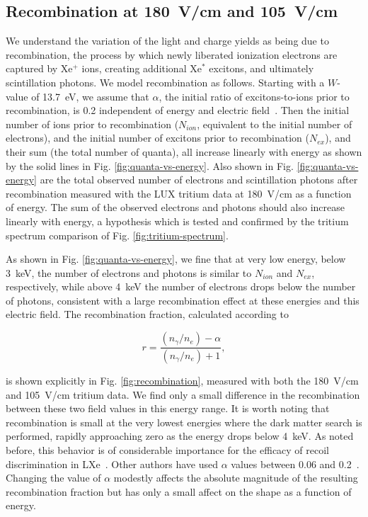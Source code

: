 \subsection{Recombination at 180~V/cm and 105~V/cm}

We understand the variation of the light and charge yields as being due to recombination, the process by which newly liberated ionization electrons are captured by Xe$^+$ ions, creating additional Xe$^*$ excitons, and ultimately scintillation photons. We model recombination as follows. Starting with a $W$-value of 13.7~eV, we assume that $\alpha$, the initial ratio of excitons-to-ions prior to recombination, is 0.2 independent of energy and electric field~\cite{Doke_alpha}. Then the initial number of ions prior to recombination ($N_{ion}$, equivalent to the initial number of electrons), and the initial number of excitons prior to recombination ($N_{ex}$), and their sum (the total number of quanta), all increase linearly with energy as shown by the solid lines in Fig. \ref{fig:quanta-vs-energy}. Also shown in Fig. \ref{fig:quanta-vs-energy} are the total observed number of electrons and scintillation photons after recombination measured with the LUX tritium data at 180~V/cm as a function of energy. The sum of the observed electrons and photons should also increase linearly with energy, a hypothesis which is tested and confirmed by the tritium spectrum comparison of Fig. \ref{fig:tritium-spectrum}.

As shown in Fig. \ref{fig:quanta-vs-energy}, we fine that at very low energy, below 3~keV, the number of electrons and photons is similar to $N_{ion}$ and $N_{ex}$, respectively, while above 4~keV the number of electrons drops below the number of photons, consistent with a large recombination effect at these energies and this electric field. The recombination fraction, calculated according to

\begin{equation}
r = \frac{(n_{\gamma}/n_e) - \alpha}{(n_{\gamma}/n_e) + 1},
\end{equation}

\noindent
is shown explicitly in Fig. \ref{fig:recombination}, measured with both the 180~V/cm and 105~V/cm tritium data. We find only a small difference in the recombination between these two field values in this energy range. It is worth noting that recombination is small at the very lowest energies where the dark matter search is performed, rapidly approaching zero as the energy drops below 4~keV. As noted before, this behavior is of considerable importance for the efficacy of recoil discrimination in LXe~\cite{xed-discrimination}. Other authors have used $\alpha$ values between 0.06 and 0.2~\cite{kaixuan}. Changing the value of $\alpha$ modestly affects the absolute magnitude of the resulting recombination fraction but has only a small affect on the shape as a function of energy. 

